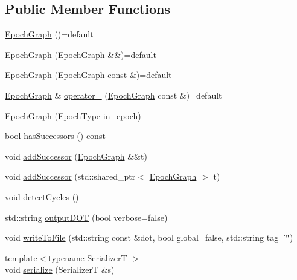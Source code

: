 \subsection*{Public Member Functions}
\begin{DoxyCompactItemize}
\item 
\hyperlink{structvt_1_1termination_1_1graph_1_1_epoch_graph_a2ad0e6af761b4ff43605ad9d3f33d709}{Epoch\+Graph} ()=default
\item 
\hyperlink{structvt_1_1termination_1_1graph_1_1_epoch_graph_a84f82857261951f8ec3670e6f5378898}{Epoch\+Graph} (\hyperlink{structvt_1_1termination_1_1graph_1_1_epoch_graph}{Epoch\+Graph} \&\&)=default
\item 
\hyperlink{structvt_1_1termination_1_1graph_1_1_epoch_graph_aabf50c2ebc474b7683742fe1e9d8d25a}{Epoch\+Graph} (\hyperlink{structvt_1_1termination_1_1graph_1_1_epoch_graph}{Epoch\+Graph} const \&)=default
\item 
\hyperlink{structvt_1_1termination_1_1graph_1_1_epoch_graph}{Epoch\+Graph} \& \hyperlink{structvt_1_1termination_1_1graph_1_1_epoch_graph_a5039bbba31fdc12c8f815c2621aa5722}{operator=} (\hyperlink{structvt_1_1termination_1_1graph_1_1_epoch_graph}{Epoch\+Graph} const \&)=default
\item 
\hyperlink{structvt_1_1termination_1_1graph_1_1_epoch_graph_a5901050dea0006f1dfea98871ff77c1b}{Epoch\+Graph} (\hyperlink{namespacevt_a985a5adf291c34a3ca263b3378388236}{Epoch\+Type} in\+\_\+epoch)
\item 
bool \hyperlink{structvt_1_1termination_1_1graph_1_1_epoch_graph_a1ab5f8a6b8107f2f08216f6036a81aa8}{has\+Successors} () const
\item 
void \hyperlink{structvt_1_1termination_1_1graph_1_1_epoch_graph_a5cce93e76f25941872d9176c8f3d6770}{add\+Successor} (\hyperlink{structvt_1_1termination_1_1graph_1_1_epoch_graph}{Epoch\+Graph} \&\&t)
\item 
void \hyperlink{structvt_1_1termination_1_1graph_1_1_epoch_graph_a9d611bd2b00472b7a66adc68aa86ff7f}{add\+Successor} (std\+::shared\+\_\+ptr$<$ \hyperlink{structvt_1_1termination_1_1graph_1_1_epoch_graph}{Epoch\+Graph} $>$ t)
\item 
void \hyperlink{structvt_1_1termination_1_1graph_1_1_epoch_graph_ab1b5d635c0d47e17fe1b5302370bf2d0}{detect\+Cycles} ()
\item 
std\+::string \hyperlink{structvt_1_1termination_1_1graph_1_1_epoch_graph_a75bdd706336677de5f3d5eb13428cf08}{output\+D\+OT} (bool verbose=false)
\item 
void \hyperlink{structvt_1_1termination_1_1graph_1_1_epoch_graph_a10aa0f193aeeb2f9389bff1bc6a4e4fc}{write\+To\+File} (std\+::string const \&dot, bool global=false, std\+::string tag=\char`\"{}\char`\"{})
\item 
{\footnotesize template$<$typename SerializerT $>$ }\\void \hyperlink{structvt_1_1termination_1_1graph_1_1_epoch_graph_aaa36d3e3ff2dc34ba2a36efbac7d7f16}{serialize} (SerializerT \&s)
\end{DoxyCompactItemize}
